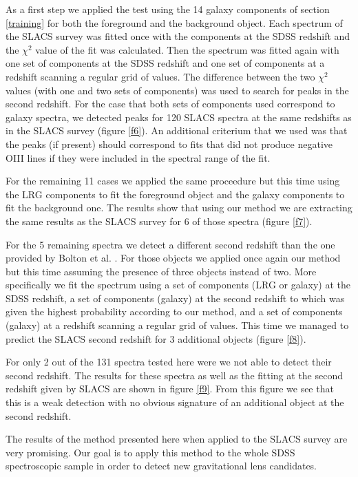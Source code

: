 \documentclass[apj]{emulateapj}
\begin{document}
As a first step we applied the test using the 14 galaxy components of section \ref{training} for both the foreground and the background object. Each spectrum of the SLACS survey was fitted once with the components at the SDSS redshift and the $\chi^2$ value of the fit was calculated. Then the spectrum was fitted again with one set of components at the SDSS redshift and one set of components at a redshift scanning a regular grid of values. The difference between the two $\chi^2$ values (with one and two sets of components) was used to search for peaks in the second redshift. For the case that both sets of components used correspond to galaxy spectra, we detected peaks for 120 SLACS spectra at the same redshifts as in the SLACS survey (figure \ref{f6}). An additional criterium that we used was that the peaks (if present) should correspond to fits that did not produce negative OIII lines if they were included in the spectral range of the fit.

For the remaining 11 cases we applied the same proceedure but this time using the LRG components to fit the foreground object and the galaxy components to fit the background one. The results show that using our method we are extracting the same results as the SLACS survey for 6 of those spectra (figure \ref{f7}).

For the 5 remaining spectra we detect a different second redshift than the one provided by Bolton et al. \cite{bolton}. For those objects we applied once again our method but this time assuming the presence of three objects instead of two. More specifically we fit the spectrum using a set of components (LRG or galaxy) at the SDSS redshift, a set of components (galaxy) at the second redshift to which was given the highest probability according to our method, and a set of components (galaxy) at a redshift scanning a regular grid of values. This time we managed to predict the SLACS second redshift for 3 additional objects (figure \ref{f8}).

For only 2 out of the 131 spectra tested here were we not able to detect their second redshift. The results for these spectra as well as the fitting at the second redshift given by SLACS are shown in figure \ref{f9}. From this figure we see that this is a weak detection with no obvious signature of an additional object at the second redshift.

The results of the method presented here when applied to the SLACS survey are very promising. Our goal is to apply this method to the whole SDSS spectroscopic sample in order to detect new gravitational lens candidates.
\end{document}
